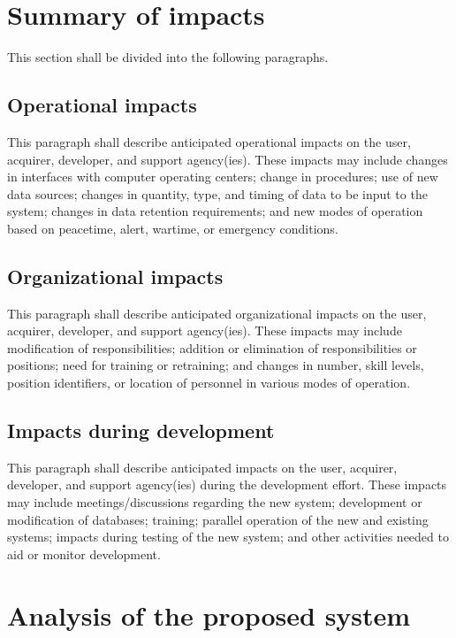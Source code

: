 \documentclass{fidata-report-template}
\begin{document}
\section{Summary of impacts}

This section shall be divided into the following paragraphs.

\subsection{Operational impacts}

This paragraph shall describe anticipated operational impacts on the
user, acquirer, developer, and support agency(ies). These impacts may
include changes in interfaces with computer operating centers; change in
procedures; use of new data sources; changes in quantity, type, and
timing of data to be input to the system; changes in data retention
requirements; and new modes of operation based on peacetime, alert,
wartime, or emergency conditions.

\subsection{Organizational impacts}

This paragraph shall describe anticipated organizational impacts on the
user, acquirer, developer, and support agency(ies). These impacts may
include modification of responsibilities; addition or elimination of
responsibilities or positions; need for training or retraining; and
changes in number, skill levels, position identifiers, or location of
personnel in various modes of operation.

\subsection{Impacts during development}

This paragraph shall describe anticipated impacts on the user, acquirer,
developer, and support agency(ies) during the development effort. These
impacts may include meetings/discussions regarding the new system;
development or modification of databases; training; parallel operation
of the new and existing systems; impacts during testing of the new
system; and other activities needed to aid or monitor development.

\section{Analysis of the proposed system}
\end{document}

